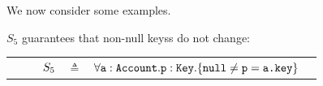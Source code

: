 We now consider some examples.

%  

{
 \begin{example}
 \label{example:twostate}
 $S_5$  guarantees   that   non-null keyss do not change:
 \\
 \begin{tabular}{lcll}
$\strut \ \ \ \ \ \ \ \ S_5$ & $\triangleq$   & ${\forall {\mbox{\normalfont{\texttt{a}}}:\mbox{\normalfont{\texttt{Account}}}.\mbox{\normalfont{\texttt{p}}}:\mbox{\normalfont{\texttt{Key}}}}.{{\{}}{\mbox{\normalfont{\texttt{null}}}\neq \mbox{\normalfont{\texttt{p}}}=\mbox{\normalfont{\texttt{a.key}}}}{{\}}}} $  \end{tabular}
 \end{example} 
 }
